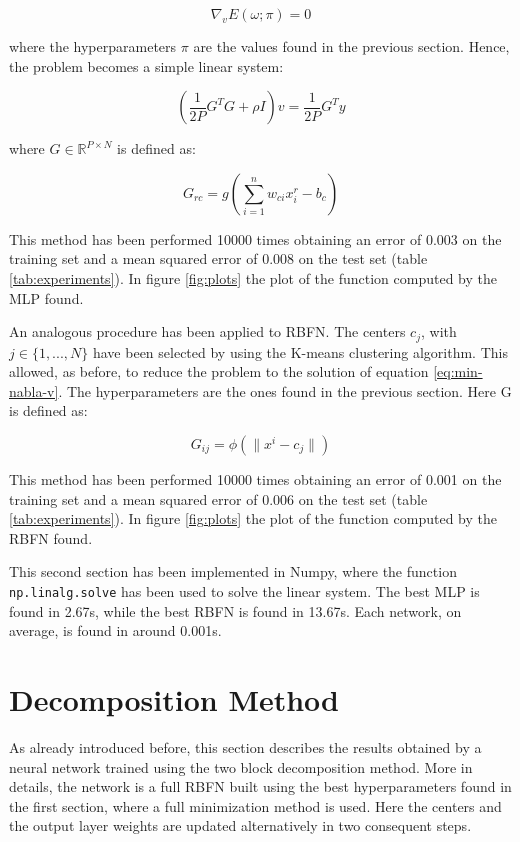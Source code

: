 \documentclass[a4paper]{article}
\numberwithin{equation}{section} %
\numberwithin{figure}{section} %
\numberwithin{table}{section} %
\theoremstyle{definition}
\begin{document}
\begin{equation}
 	\label{eq:min-nabla-v}
	\nabla_v E(\omega; \pi) = 0
\end{equation}

\noindent where the hyperparameters $\pi$ are the values found in the previous
section. Hence, the problem becomes a simple linear system:

\[ \left( \frac{1}{2P} G^T G + \rho I \right) v = \frac{1}{2P} G^T y \]

\noindent where $G \in \mathbb{R}^{P \times N}$ is defined as:

\[ G_{rc} = g\left( \sum_{i=1}^{n} w_{ci}x_i^r - b_c \right) \]

This method has been performed 10000 times obtaining an error of 0.003 on the
training set and a mean squared error of 0.008 on the test set (table \ref{tab:experiments}). In figure
\ref{fig:plots} the plot of the function computed by the MLP found.

An analogous procedure has been applied to RBFN.
The centers $c_j$, with $ j \in \{ 1,  ..., N \} $ have been selected by
using the K-means clustering algorithm. This allowed, as before, to reduce the
problem to the solution of equation \ref{eq:min-nabla-v}. The hyperparameters
are the ones found in the previous section. Here G is defined as:

\[ G_{ij} = \phi\left( \| x^i - c_j \| \right) \]

This method has been performed 10000 times obtaining an error of 0.001 on the
training set and a mean squared error of 0.006 on the test set (table \ref{tab:experiments}). In figure
\ref{fig:plots} the plot of the function computed by the RBFN found.

This second section has been implemented in Numpy, where the function
\texttt{np.linalg.solve} has been used to solve the linear system. The best MLP
is found in 2.67s, while the best RBFN is found in 13.67s. Each network, on average,
is found in around 0.001s.


\section{Decomposition Method}
As already introduced before, this section describes the results obtained by a
neural network trained using the two block decomposition method.
More in details, the network is a full RBFN built using the best hyperparameters
found in the first section, where a full minimization method is used.
Here the centers and the output layer weights are updated alternatively in two consequent steps.
\end{document}
